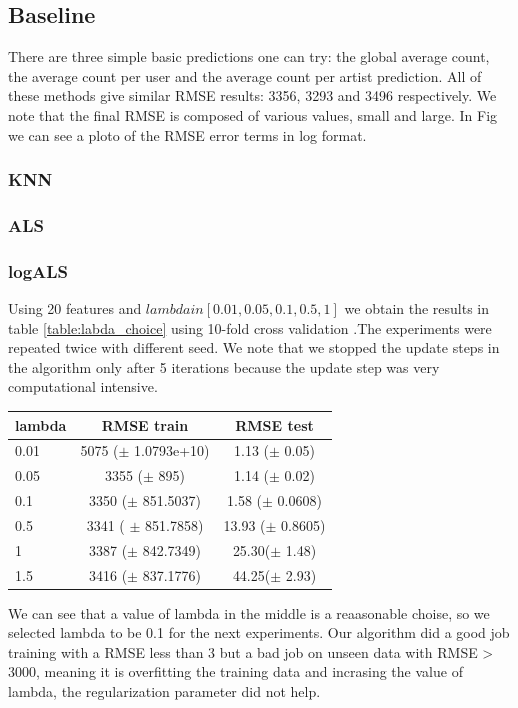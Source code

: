 \subsection{Baseline}
There are three simple basic predictions one can try: the global average count, the average count per user and the average count
per artist prediction. All of these methods give similar RMSE results: 3356, 3293 and 3496 respectively.
We note that the final RMSE is composed of various values, small and large. In Fig we can see a ploto of the RMSE error terms in log format.

\subsubsection{KNN}
\subsubsection{ALS}

\subsubsection{logALS}
Using 20 features and $lambda in [0.01,0.05,0.1,0.5,1]$ we obtain the results in table \ref{table:labda_choice} using 10-fold cross validation .The experiments were repeated twice with different seed. We note that we stopped the update steps in the algorithm only after 5 iterations because the update step was very computational intensive.
\begin{center}
  \begin{tabular}{ |l | c | c| }
    \hline
     lambda & RMSE train & RMSE test \\ \hline
     0.01   & 5075 ($\pm$  1.0793e+10) & 1.13 ($\pm$ 0.05) \\ \hline
     0.05  &  3355 ($\pm$  895)            &                1.14 ($\pm$  0.02)                   \\ \hline
     0.1     & 3350 ($\pm$ 851.5037)  & 1.58 ($\pm$ 0.0608) \\ \hline
     0.5    & 3341  ( $\pm$ 851.7858)   &13.93 ($\pm$ 0.8605)\\ \hline
     1       & 3387 ($\pm$ 842.7349)   &25.30($\pm$ 1.48)\\ \hline
     1.5    & 3416 ($\pm$ 837.1776) & 44.25($\pm$ 2.93) \\
    \hline
  \end{tabular}
  	\label{table:labda_choice}
\end{center}
We can see that a value of lambda in the middle is a reaasonable choise, so we selected lambda to be 0.1 for the next experiments.
Our algorithm did a good job training  with a RMSE less than  3 but a bad job on unseen data with RMSE > 3000, meaning it is overfitting 
the training data and incrasing the value of lambda, the regularization parameter did not help.


